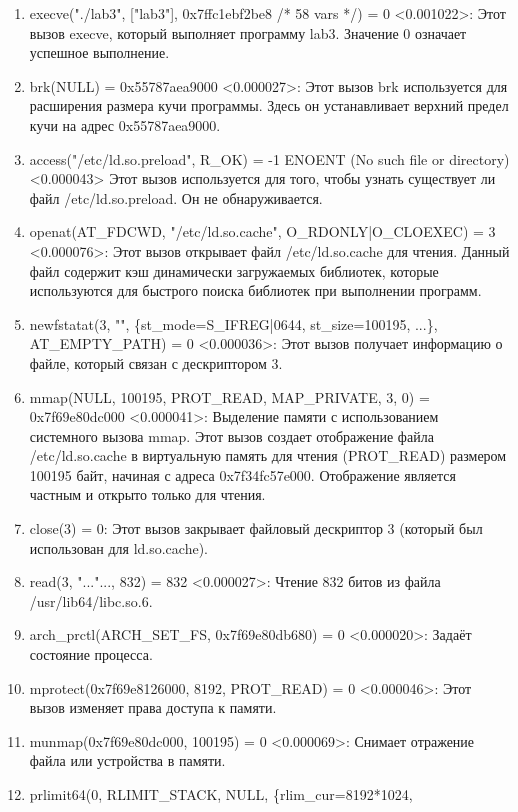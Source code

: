 \documentclass[a4paper, 12pt]{article}
\begin{document}
\begin{enumerate}
    \item execve("./lab3", ["lab3"], 0x7ffc1ebf2be8 /* 58 vars */) = 0 <0.001022>: Этот вызов execve, который выполняет программу lab3. Значение 0 означает успешное выполнение.
    \item brk(NULL)                               = 0x55787aea9000 <0.000027>: Этот вызов brk используется для расширения размера кучи программы. Здесь он устанавливает верхний предел кучи на адрес 0x55787aea9000.
    \item access("/etc/ld.so.preload", R\_OK) = -1 ENOENT (No such file or directory) <0.000043> Этот вызов используется для того, чтобы узнать существует ли файл /etc/ld.so.preload. Он не обнаруживается.
    \item openat(AT\_FDCWD, "/etc/ld.so.cache", O\_RDONLY|O\_CLOEXEC) = 3 <0.000076>: Этот вызов открывает файл /etc/ld.so.cache для чтения. Данный файл содержит кэш динамически загружаемых библиотек, которые используются для быстрого поиска библиотек при выполнении программ.
    \item newfstatat(3, "", \{st\_mode=S\_IFREG|0644, st\_size=100195, ...\}, \\AT\_EMPTY\_PATH) = 0 <0.000036>:
    Этот вызов получает информацию о файле, который связан с дескриптором 3.
    \item mmap(NULL, 100195, PROT\_READ, MAP\_PRIVATE, 3, 0) = \\0x7f69e80dc000 <0.000041>: 
    Выделение памяти с использованием системного вызова mmap. Этот вызов создает отображение файла /etc/ld.so.cache в виртуальную память для чтения (PROT\_READ) размером 100195 байт, начиная с адреса 0x7f34fc57e000. Отображение является частным и открыто только для чтения.
    \item close(3) = 0: Этот вызов закрывает файловый дескриптор 3 (который был использован для ld.so.cache).
    \item read(3, "..."..., 832) = 832 <0.000027>: Чтение 832 битов из файла 
    \\/usr/lib64/libc.so.6.
    \item arch\_prctl(ARCH\_SET\_FS, 0x7f69e80db680) = 0 <0.000020>: Задаёт состояние процесса.
    \item mprotect(0x7f69e8126000, 8192, PROT\_READ) = 0 <0.000046>: Этот вызов изменяет права доступа к памяти. 
    \item munmap(0x7f69e80dc000, 100195) = 0 <0.000069>: Снимает отражение файла или устройства в памяти.
    \item prlimit64(0, RLIMIT\_STACK, NULL, \{rlim\_cur=8192*1024, 

\end{enumerate}
\end{document}
